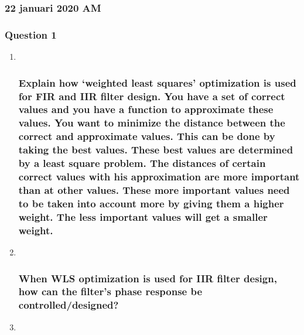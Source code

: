 \documentclass[
  a4paper,
  ,captions=tableheading
]{scrartcl}
\begin{document}
\subsubsection{\texorpdfstring{\textbf{22 januari 2020
AM}}{22 januari 2020 AM}}\label{januari-2020-am}

\subsubsection{Question 1}\label{question-1-1}

\begin{enumerate}
\def\labelenumi{\arabic{enumi}.}
\item ~
  \subsubsection{Explain how `weighted least squares' optimization is
  used for FIR and IIR filter design. You have a set of correct values
  and you have a function to approximate these values. You want to
  minimize the distance between the correct and approximate values. This
  can be done by taking the best values. These best values are
  determined by a least square problem. The distances of certain correct
  values with his approximation are more important than at other values.
  These more important values need to be taken into account more by
  giving them a higher weight. The less important values will get a
  smaller
  weight.}\label{explain-how-weighted-least-squares-optimization-is-used-for-fir-and-iir-filter-design.-you-have-a-set-of-correct-values-and-you-have-a-function-to-approximate-these-values.-you-want-to-minimize-the-distance-between-the-correct-and-approximate-values.-this-can-be-done-by-taking-the-best-values.-these-best-values-are-determined-by-a-least-square-problem.-the-distances-of-certain-correct-values-with-his-approximation-are-more-important-than-at-other-values.-these-more-important-values-need-to-be-taken-into-account-more-by-giving-them-a-higher-weight.-the-less-important-values-will-get-a-smaller-weight.}
\item ~
  \subsubsection{When WLS optimization is used for IIR filter design,
  how can the filter's phase response be
  controlled/designed?}\label{when-wls-optimization-is-used-for-iir-filter-design-how-can-the-filters-phase-response-be-controlleddesigned}
\item ~

\end{enumerate}
\end{document}
